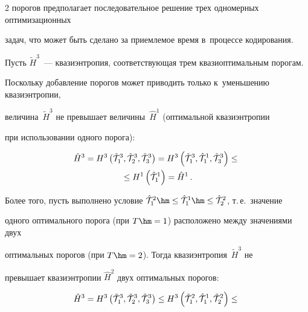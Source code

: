 \begin{multicols}{2}
порогов предполагает последовательное решение трех одномерных оптимизационных 

задач, что может быть сделано за приемлемое время в~процессе кодирования.



Пусть $\tilde{H}^3$~--- квазиэнтропия, соответствующая трем квазиоптимальным порогам. 

Поскольку до\-бав\-ле\-ние порогов может приводить только к~уменьшению квазиэнтропии, 

величина~$\tilde{H}^3$ не превышает величины~$\hat{H}^1$ (оптимальной квазиэнтропии 

при использовании одного порога):

\begin{multline*}

\tilde{H}^3 =

H^3\left({\tilde{\cal T}}^{3}_{1}, {\tilde{\cal T}}^{3}_{2}, 

{\tilde{\cal T}}^{3}_{3}\right) =

H^3\left({\tilde{\cal T}}^{3}_{1}, {\hat{\cal T}}^{1}_{1},

 {\tilde{\cal T}}^{3}_{3}\right) \leq{}\\

 {}\leq

H^1\left({\hat{\cal T}}^{1}_{1}\right) =

\hat{H}^1\,.

\end{multline*}

Более того, пусть выполнено условие ${\hat{\cal T}}^{2}_{1}\hm\leq 

{\hat{\cal T}}^{1}_{1}\hm\leq {\hat{\cal T}}^{2}_{2}$, т.\,е.\ значение 

одного оптимального порога (при $T\hm=1$) расположено между значениями двух 

оптимальных порогов (при $T\hm=2$). Тогда квазиэнтропия~$\tilde{H}^3$ не 

превышает квазиэнтропии $\hat{H}^2$ двух оптимальных порогов:

\begin{multline*}

\tilde{H}^3 =

H^3\left({\tilde{\cal T}}^{3}_{1}, {\tilde{\cal T}}^{3}_{2}, {\tilde{\cal T}}^{3}_{3}\right)\leq

H^3\left({\tilde{\cal T}}^{2}_{1}, {\hat{\cal T}}^{1}_{1}, 

{\tilde{\cal T}}^{2}_{2}\right) \leq{}\\


\end{multline*}
\end{multicols}
